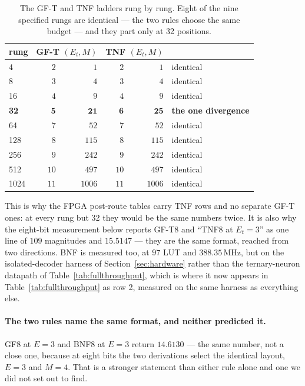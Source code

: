 \documentclass[11pt]{article}
\theoremstyle{definition}
\begin{document}
\begin{table}[t]\centering
\caption{The GF-T and TNF ladders rung by rung. Eight of the nine specified
rungs are identical --- the two rules choose the same budget --- and they part
only at 32 positions.}
\label{tab:gftvstnf}
\begin{tabular}{lrrrrl}
\toprule
rung & \multicolumn{2}{c}{GF-T $(E_t, M)$} & \multicolumn{2}{c}{TNF $(E_t, M)$} & \\
\midrule
4    & $2$ & $1$    & $2$ & $1$    & identical \\
8    & $3$ & $4$    & $3$ & $4$    & identical \\
16   & $4$ & $9$    & $4$ & $9$    & identical \\
\textbf{32} & $\mathbf{5}$ & $\mathbf{21}$ & $\mathbf{6}$ & $\mathbf{25}$ & \textbf{the one divergence} \\
64   & $7$ & $52$   & $7$ & $52$   & identical \\
128  & $8$ & $115$  & $8$ & $115$  & identical \\
256  & $9$ & $242$  & $9$ & $242$  & identical \\
512  & $10$ & $497$ & $10$ & $497$ & identical \\
1024 & $11$ & $1006$& $11$ & $1006$& identical \\
\bottomrule
\end{tabular}
\end{table}

This is why the FPGA post-route tables carry TNF rows and no separate GF-T ones: at
every rung but 32 they would be the same numbers twice. It is also why the
eight-bit measurement below reports GF-T8 and ``TNF8 at $E_t=3$'' as one line
of $109$ magnitudes and $15.5147$ --- they are the same format, reached from two
directions. BNF is measured too, at $97$ LUT and $388.35$\,MHz, but on the
isolated-decoder harness of Section~\ref{sec:hardware} rather than the
ternary-neuron datapath of Table~\ref{tab:fullthroughput}, which is where
it now appears in Table~\ref{tab:fullthroughput} as row 2, measured on the
same harness as everything else.

\paragraph{The two rules name the same format, and neither predicted it.}
GF8 at $E=3$ and BNF8 at $E=3$ return $14.6130$ --- the same number, not a close
one, because at eight bits the two derivations select the identical layout,
$E=3$ and $M=4$. That is a stronger statement than either rule alone and one we
did not set out to find.
\end{document}
